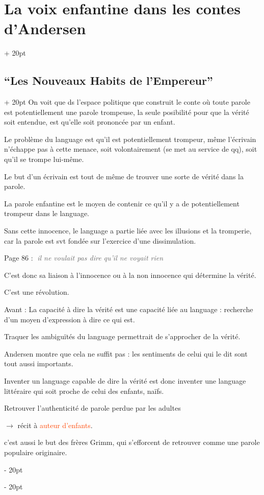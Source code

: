 \documentclass[a4paper, 12pt, twoside]{article}
\renewcommand{\emph}{\textcolor{ff4500}}
\newcommand{\simplecit}[1]{\guillemotleft$\;$#1$\;$\guillemotright}
\newcommand{\cit}[1]{\simplecit{\textcolor{656565}{#1}}}
\newcommand{\quo}[1]{\cit{\it #1}}
\newcommand{\ind}[1][20pt]{\advance\leftskip + #1}
\newcommand{\deind}[1][20pt]{\advance\leftskip - #1}
\newenvironment{indt}[2][20pt]{#2 \par \ind[#1]}{\par \deind} %
\begin{document}
\begin{indt}{\section{La voix enfantine dans les contes d'Andersen}}
\begin{indt}{\subsection{``Les Nouveaux Habits de l'Empereur''}}
            On voit que ds l'espace politique que construit le conte où toute parole est potentiellement une parole trompeuse, la seule posibilité pour que la vérité soit entendue, est qu'elle soit prononcée par un enfant.%
            
            Le problème du language est qu'il est potentiellement trompeur, même l'écrivain n'échappe pas à cette menace, soit volontairement (se met au service de qq), soit qu'il se trompe lui-même.
            
            Le but d'un écrivain est tout de même de trouver une sorte de vérité dans la parole.
            
            La parole enfantine est le moyen de contenir ce qu'il y a de potentiellement trompeur dans le language.
            
            Sans cette innocence, le language a partie liée avec les illusions et la tromperie, car la parole est svt fondée sur l'exercice d'une dissimulation.
            
            Page 86 : \quo{il ne voulait pas dire qu'il ne voyait rien}
            
            C'est donc sa liaison à l'innocence ou à la non innocence qui détermine la vérité.
            
            C'est une révolution.
            
            Avant : La capacité à dire la vérité est une capacité liée au language : recherche d'un moyen d'expression à dire ce qui est.
            
            Traquer les ambiguïtés du language permettrait de s'approcher de la vérité.
            
            Andersen montre que cela ne suffit pas : les sentiments de celui qui le dit sont tout aussi importants.
            
            Inventer un language capable de dire la vérité est donc inventer une language littéraire qui soit proche de celui des enfants, naïfs.
            
            Retrouver l'authenticité de parole perdue par les adultes
            
            $\rightarrow$ récit à \emph{auteur d'enfants}.
            
            \vspace{12pt}
            
            c'est aussi le but des frères Grimm, qui s'efforcent de retrouver comme une parole populaire originaire.
            

\end{indt}
\end{indt}
\end{document}
